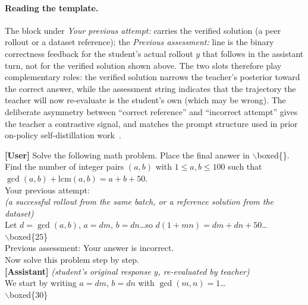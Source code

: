 \documentclass{llmxive}
\begin{document}
\paragraph{Reading the template.} The block under \emph{Your previous attempt:} carries the verified solution (a peer rollout or a dataset reference); the \emph{Previous assessment:} line is the binary correctness feedback for the student's actual rollout $y$ that follows in the assistant turn, not for the verified solution shown above. The two slots therefore play complementary roles: the verified solution narrows the teacher's posterior toward the correct answer, while the assessment string indicates that the trajectory the teacher will now re-evaluate is the student's own (which may be wrong). The deliberate asymmetry between ``correct reference'' and ``incorrect attempt'' gives the teacher a contrastive signal, and matches the prompt structure used in prior on-policy self-distillation work~\citep{sdpo,opsd}.

\begin{tcolorbox}[breakable,colback=gray!3,colframe=gray!50,title={\small Math (AIME / HMMT / MinervaMath) --- self-teacher context},fonttitle=\bfseries\small,boxrule=0.5pt,arc=2pt,left=4pt,right=4pt,top=2pt,bottom=2pt]
  \small\ttfamily
  {\textbf{[User]}} {Solve the following math problem. Place the final answer in $\backslash$boxed\{\}.}\\
  {Find the number of integer pairs $(a,b)$ with $1 \le a,b \le 100$ such that $\gcd(a,b)+\mathrm{lcm}(a,b)=a+b+50$.}\\[3pt]
  Your previous attempt:\\
  \textrm{\textit{(a successful rollout from the same batch, or a reference solution from the dataset)}}\\
  Let $d=\gcd(a,b)$, $a=dm$, $b=dn$\ldots so $d(1+mn)=dm+dn+50$\ldots\\
  $\backslash$boxed\{$25$\}\\[3pt]
  {Previous assessment: Your answer is incorrect.}\\[3pt]
  Now solve this problem step by step.\\[3pt]
  {\textbf{[Assistant]}} {\textit{(student's original response $y$, re-evaluated by teacher)}}\\
  {We start by writing $a=dm$, $b=dn$ with $\gcd(m,n)=1$\ldots}\\
  {$\backslash$boxed\{$30$\}}
\end{tcolorbox}
\end{document}
